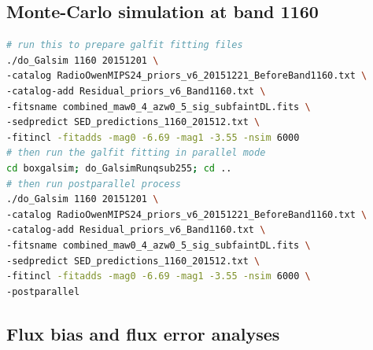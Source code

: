 \documentclass[11pt,a4paper]{article}
\begin{document}
\subsection{Monte-Carlo simulation at band 1160}
\label{Band1160_Galsim}

\begin{lstlisting}[language=bash]
# run this to prepare galfit fitting files
./do_Galsim 1160 20151201 \
-catalog RadioOwenMIPS24_priors_v6_20151221_BeforeBand1160.txt \
-catalog-add Residual_priors_v6_Band1160.txt \
-fitsname combined_maw0_4_azw0_5_sig_subfaintDL.fits \
-sedpredict SED_predictions_1160_201512.txt \
-fitincl -fitadds -mag0 -6.69 -mag1 -3.55 -nsim 6000 
# then run the galfit fitting in parallel mode
cd boxgalsim; do_GalsimRunqsub255; cd ..
# then run postparallel process
./do_Galsim 1160 20151201 \
-catalog RadioOwenMIPS24_priors_v6_20151221_BeforeBand1160.txt \
-catalog-add Residual_priors_v6_Band1160.txt \
-fitsname combined_maw0_4_azw0_5_sig_subfaintDL.fits \
-sedpredict SED_predictions_1160_201512.txt \
-fitincl -fitadds -mag0 -6.69 -mag1 -3.55 -nsim 6000 \
-postparallel
\end{lstlisting}


\subsection{Flux bias and flux error analyses}
\label{Band1160_simanalyses}
\end{document}
